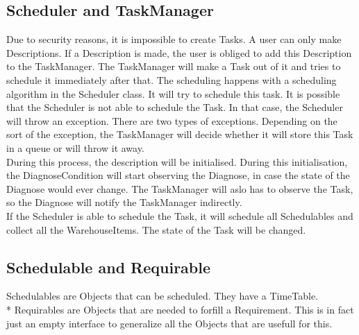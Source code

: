 \documentclass[12pt]{article}
\begin{document}
\subsection{Scheduler and TaskManager}
Due to security reasons, it is impossible to create Tasks. A user can only make Descriptions. If a Description is made, the user is obliged to add this Description to the TaskManager. The TaskManager will make a Task out of it and tries to schedule it immediately after that. The scheduling happens with a scheduling algorithm in the Scheduler class. It will try to schedule this task. It is possible that the Scheduler is not able to schedule the Task. In that case, the Scheduler will throw an exception. There are two types of exceptions. Depending on the sort of the exception, the TaskManager will decide whether it will store this Task in a queue or will throw it away.\\
During this process, the description will be initialised. During this initialisation, the DiagnoseCondition will start observing the Diagnose, in case the state of the Diagnose would ever change. The TaskManager will aslo has to observe the Task, so the Diagnose will notify the TaskManager indirectly.\\
If the Scheduler is able to schedule the Task, it will schedule all Schedulables and collect all the WarehouseItems. The state of the Task will be changed.
\subsection{Schedulable and Requirable}
Schedulables are Objects that can be scheduled. They have a TimeTable.\\*
Requirables are Objects that are needed to forfill a Requirement. This is in fact just an empty interface to generalize all the Objects that are usefull for this.
\end{document}
